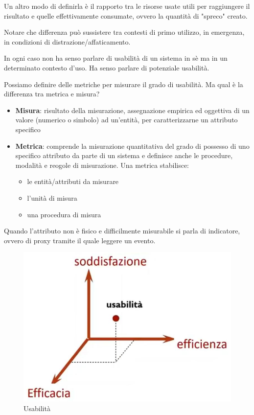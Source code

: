 \documentclass[11pt,a4paper]{book}
\begin{document}
Un altro modo di definirla è il rapporto tra le risorse usate utili per raggiungere il risultato e quelle effettivamente consumate, ovvero la quantità di "spreco" creato.

Notare che differenza può sussistere tra contesti di primo utilizzo, in emergenza, in condizioni di distrazione/affaticamento.

In ogni caso non ha senso parlare di usabilità di un sistema in sè ma in un determinato contesto d'uso. Ha senso parlare di potenziale usabilità.

Possiamo definire delle metriche per misurare il grado di usabilità. Ma qual è la differenza tra metrica e misura?
\begin{itemize}
	\item \textbf{Misura}: risultato della misurazione, assegnazione empirica ed oggettiva di un valore (numerico o simbolo) ad un'entità, per caratterizzarne un attributo specifico
	\item \textbf{Metrica}: comprende la misurazione quantitativa del grado di possesso di uno specifico attributo da parte di un sistema e definisce anche le procedure, modalità e reogole di misurazione. Una metrica stabilisce:
	\begin{itemize}
		\item le entità/attributi da misurare
		\item l'unità di misura
		\item una procedura di misura
	\end{itemize}
\end{itemize}

Quando l'attributo non è fisico e difficilmente misurabile si parla di indicatore, ovvero di proxy tramite il quale leggere un evento.
\begin{figure}[h!]
	\begin{center}
		\includegraphics[scale=0.6]{img/020.jpg}
		\caption{Usabilità}
		\label{fig: 020}
	\end{center}
\end{figure}
\end{document}
